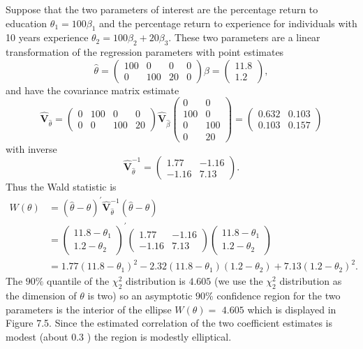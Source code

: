 \documentclass[10pt]{article}
\begin{document}
Suppose that the two parameters of interest are the percentage return to education $\theta_{1}=100 \beta_{1}$ and the percentage return to experience for individuals with 10 years experience $\theta_{2}=100 \beta_{2}+20 \beta_{3}$. These two parameters are a linear transformation of the regression parameters with point estimates
$$
\widehat{\theta}=\left(\begin{array}{cccc}
100 & 0 & 0 & 0 \\
0 & 100 & 20 & 0
\end{array}\right) \widehat{\beta}=\left(\begin{array}{c}
11.8 \\
1.2
\end{array}\right),
$$
and have the covariance matrix estimate
$$
\widehat{\boldsymbol{V}}_{\widehat{\theta}}=\left(\begin{array}{cccc}
0 & 100 & 0 & 0 \\
0 & 0 & 100 & 20
\end{array}\right) \widehat{\boldsymbol{V}}_{\widehat{\beta}}\left(\begin{array}{cc}
0 & 0 \\
100 & 0 \\
0 & 100 \\
0 & 20
\end{array}\right)=\left(\begin{array}{cc}
0.632 & 0.103 \\
0.103 & 0.157
\end{array}\right)
$$
with inverse
$$
\widehat{\boldsymbol{V}}_{\widehat{\theta}}^{-1}=\left(\begin{array}{cc}
1.77 & -1.16 \\
-1.16 & 7.13
\end{array}\right) .
$$
Thus the Wald statistic is
$$
\begin{aligned}
W(\theta) &=(\widehat{\theta}-\theta)^{\prime} \widehat{\boldsymbol{V}}_{\widehat{\theta}}^{-1}(\widehat{\theta}-\theta) \\
&=\left(\begin{array}{c}
11.8-\theta_{1} \\
1.2-\theta_{2}
\end{array}\right)^{\prime}\left(\begin{array}{cc}
1.77 & -1.16 \\
-1.16 & 7.13
\end{array}\right)\left(\begin{array}{c}
11.8-\theta_{1} \\
1.2-\theta_{2}
\end{array}\right) \\
&=1.77\left(11.8-\theta_{1}\right)^{2}-2.32\left(11.8-\theta_{1}\right)\left(1.2-\theta_{2}\right)+7.13\left(1.2-\theta_{2}\right)^{2} .
\end{aligned}
$$
The $90 \%$ quantile of the $\chi_{2}^{2}$ distribution is $4.605$ (we use the $\chi_{2}^{2}$ distribution as the dimension of $\theta$ is two) so an asymptotic $90 \%$ confidence region for the two parameters is the interior of the ellipse $W(\theta)=$ $4.605$ which is displayed in Figure 7.5. Since the estimated correlation of the two coefficient estimates is modest (about $0.3$ ) the region is modestly elliptical.
\end{document}
